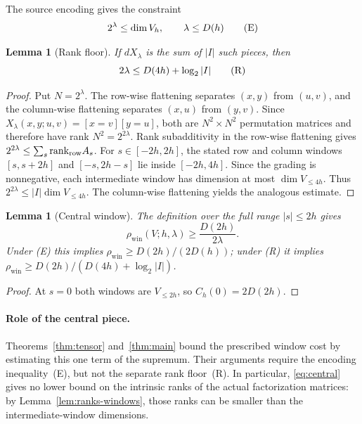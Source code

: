 \documentclass[10pt,a4paper]{article}
\numberwithin{equation}{section}
\newtheorem{lemma}[theorem]{Lemma}\newtheorem{proposition}[theorem]{Proposition}
\theoremstyle{remark}\newtheorem{remark}[theorem]{Remark}\newtheorem{question}[theorem]{Question}
\newcommand{\rhow}{\rho_{\mathrm{win}}}\newcommand{\F}{\mathbb F}\newcommand{\K}{\mathbb K}\newcommand{\Z}{\mathbb Z}\newcommand{\R}{\mathbb R}\newcommand{\cB}{\mathcal L}\newcommand{\wt}{\mathrm{wt}}\newcommand{\dimn}{\operatorname{dim}}\newcommand{\supp}{\operatorname{supp}}
\begin{document}
The source encoding gives the constraint
\[2^\lambda\le\dimn V_h,\qquad \lambda\le D(h)\qquad\textup{(E)}\]
\begin{lemma}[Rank floor]\label{lem:rankfloor}
If $dX_\lambda$ is the sum of $|I|$ such pieces, then
\[2\lambda\le D(4h)+\log_2|I|\qquad\textup{(R)}\]
\end{lemma}
\begin{proof}Put $N=2^\lambda$. The row-wise flattening separates $(x,y)$ from $(u,v)$, and the column-wise flattening separates $(x,u)$ from $(y,v)$. Since $X_\lambda(x,y;u,v)=[x=v][y=u]$, both are $N^2\times N^2$ permutation matrices and therefore have rank $N^2=2^{2\lambda}$. Rank subadditivity in the row-wise flattening gives $2^{2\lambda}\le\sum_s\mathrm{rank}_{\rm row}A_s$. For $s\in[-2h,2h]$, the stated row and column windows $[s,s+2h]$ and $[-s,2h-s]$ lie inside $[-2h,4h]$. Since the grading is nonnegative, each intermediate window has dimension at most $\dimn V_{\le4h}$. Thus $2^{2\lambda}\le|I|\dimn V_{\le4h}$. The column-wise flattening yields the analogous estimate.\end{proof}
\begin{lemma}[Central window]\label{lem:central}
The definition over the \emph{full} range $|s|\le2h$ gives
\begin{equation}\label{eq:central}\rhow(V;h,\lambda)\ge\frac{D(2h)}{2\lambda}.\end{equation}
Under (E) this implies $\rhow\ge D(2h)/(2D(h))$; under (R) it implies $\rhow\ge D(2h)/(D(4h)+\log_2|I|)$.
\end{lemma}
\begin{proof}At $s=0$ both windows are $V_{\le2h}$, so $C_h(0)=2D(2h)$.\end{proof}
\paragraph{Role of the central piece.}
Theorems~\ref{thm:tensor} and~\ref{thm:main} bound the prescribed window cost by estimating this one term of the supremum. Their arguments require the encoding inequality~\textup{(E)}, but not the separate rank floor~\textup{(R)}. In particular, \eqref{eq:central} gives no lower bound on the intrinsic ranks of the actual factorization matrices: by Lemma~\ref{lem:ranks-windows}, those ranks can be smaller than the intermediate-window dimensions.
\end{document}
